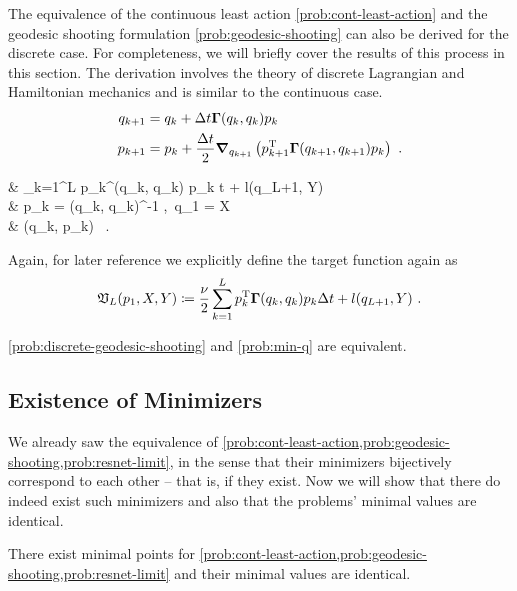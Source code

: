 The equivalence of the continuous least action \ref{prob:cont-least-action} and the geodesic shooting formulation \ref{prob:geodesic-shooting} can also be derived for the discrete case.
For completeness, we will briefly cover the results of this process in this section.
The derivation involves the theory of discrete Lagrangian and Hamiltonian mechanics and is similar to the continuous case.
\begin{equation}
\label{eq:discrete-hamiltonian-system}
\begin{split}
q_{k+1} &= q_k + \Delta t \mathbf{\Gamma}(q_k, q_k) p_k\\
p_{k+1} &= p_k + \frac{\Delta t}{2} \grad_{q_{k+1}} \left(p_{k+1}^{\mathrm{T}} \mathbf{\Gamma}(q_{k+1}, q_{k+1}) p_k\right)\ .
\end{split}
\end{equation}

\begin{problem}
	\label{prob:discrete-geodesic-shooting}
	\begin{cases}
		 &  \sum_{k=1}^L p_k^\T \bGamma(q_k, q_k) p_k \Delta t + l(q_{L+1}, Y)\\
		 & p_k = \bGamma(q_k, q_k)^{-1} ,\ q_1 = X \\
		& (q_k, p_k) \ .
	\end{cases}
\end{problem}
Again, for later reference we explicitly define the target function again as
\begin{equation}
\mathfrak{V}_L(p_1, X, Y) \coloneqq \frac{\nu}{2} \sum_{k=1}^L p_k^{\mathrm{T}} \mathbf{\Gamma}(q_k, q_k) p_k \Delta t + l(q_{L+1}, Y) \ .
\end{equation}

\begin{theorem}
	\label{theo:discrete-shooting-min-q-equivalence}
	\cref{prob:discrete-geodesic-shooting} and \cref{prob:min-q} are equivalent.
\end{theorem}

\subsection{Existence of Minimizers}

We already saw the equivalence of \cref{prob:cont-least-action,prob:geodesic-shooting,prob:resnet-limit}, in the sense that their minimizers bijectively correspond to each other -- that is, if they exist.
Now we will show that there do indeed exist such minimizers and also that the problems' minimal values are identical.
\begin{theorem}
	\label{theo:continuous-solutions-existence}
		There exist minimal points for \cref{prob:cont-least-action,prob:geodesic-shooting,prob:resnet-limit} and their minimal values are identical.
\end{theorem}

